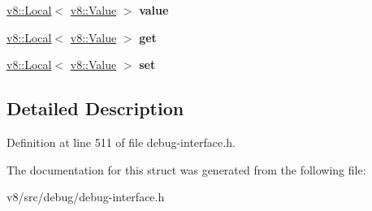 \begin{DoxyCompactItemize}
\mbox{\hyperlink{classv8_1_1Local}{v8\+::\+Local}}$<$ \mbox{\hyperlink{classv8_1_1Value}{v8\+::\+Value}} $>$ {\bfseries value}
\item 
\mbox{\label{structv8_1_1debug_1_1PropertyDescriptor_a87ecc9dfd7b1046e31644dd5eff3f0c9}} 
\mbox{\hyperlink{classv8_1_1Local}{v8\+::\+Local}}$<$ \mbox{\hyperlink{classv8_1_1Value}{v8\+::\+Value}} $>$ {\bfseries get}
\item 
\mbox{\label{structv8_1_1debug_1_1PropertyDescriptor_a85c565a2e8bc054b2ed38fefb8101af2}} 
\mbox{\hyperlink{classv8_1_1Local}{v8\+::\+Local}}$<$ \mbox{\hyperlink{classv8_1_1Value}{v8\+::\+Value}} $>$ {\bfseries set}
\end{DoxyCompactItemize}


\subsection{Detailed Description}


Definition at line 511 of file debug-\/interface.\+h.



The documentation for this struct was generated from the following file\+:\begin{DoxyCompactItemize}
\item 
v8/src/debug/debug-\/interface.\+h\end{DoxyCompactItemize}
